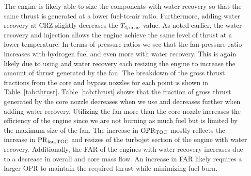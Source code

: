 \documentclass[conf]{new-aiaa}
\begin{document}
The engine is likely able to size the components with water recovery so that the same thrust is generated at a lower fuel-to-air ratio.
Furthermore, adding water recovery at CRZ slightly decreases the $T_{4,\rm{ratio}}$ value.
As noted earlier, the water recovery and injection allows the engine achieve the same level of thrust at a lower temperature.
In terms of pressure ratios we see that the fan pressure ratio increases with hydrogen fuel and even more with water recovery.
This is again likely due to using  and water recovery each resizing the engine to increase the amount of thrust generated by the fan.
The breakdown of the gross thrust fractions from the core and bypass nozzles for each point is shown in Table~\ref{tab:thrust}.
Table~\ref{tab:thrust} shows that the fraction of gross thrust generated by the core nozzle decreases when we use  and decreases further when adding water recovery.
Utilizing the fan more than the core nozzle increases the efficiency of the engine since we are not burning as much fuel but is limited by the maximum size of the fan.
The increase in $\rm{OPR}_{\rm{TOC}}$ mostly reflects the increase in $\rm{PR}_{fan,TOC}$ and resizes of the turbojet section of the engine with water recovery.
Additionally, the FAR of the engines with water recovery increases due to a decrease in overall and core mass flow.
An increase in FAR likely requires a larger OPR to maintain the required thrust while minimizing fuel burn.
\end{document}
